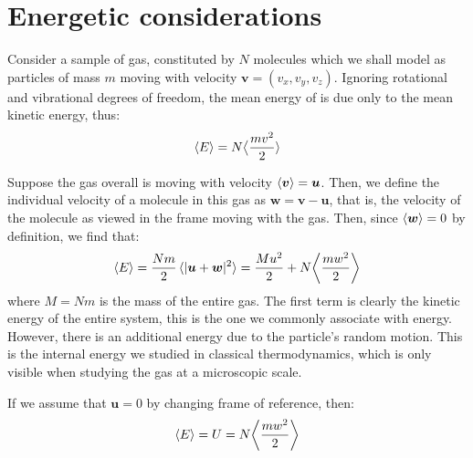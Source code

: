 \documentclass[a4paper,11pt,oneside]{book}
\newcommand{\BF}[1]{\boldsymbol{#1}}
\begin{document}
\section{Energetic considerations}
Consider a sample of gas, constituted by $N$ molecules which we shall model as particles of mass $m$ moving with velocity $\BF{v} = (v_x,v_y,v_z)$. Ignoring rotational and vibrational degrees of freedom, the mean energy of is due only to the mean kinetic energy, thus:
\begin{equation}
   \braket{E} = N \big \langle \frac{mv^2}{2}\rangle 
\end{equation}

Suppose the gas overall is moving with velocity $\braket{\BF{v}} = \BF{u}$. Then, we define the individual velocity of a molecule in this gas as $\BF{w} = \BF{v}-\BF{u}$, that is, the velocity of the molecule as viewed in the frame moving with the gas. Then, since $\braket{\BF{w}}=0$ by definition, we find that:
\begin{equation}
    \braket{E} = \frac{Nm}{2}\braket{|\BF{u}+\BF{w}|^2} = \frac{Mu^2}{2} + N \bigg \langle \frac{mw^2}{2} \bigg \rangle 
\end{equation}
where $M=Nm$ is the mass of the entire gas. The first term is clearly the kinetic energy of the entire system, this is the one we commonly associate with energy. However, there is an additional energy due to the particle's random motion. This is the internal energy we studied in classical thermodynamics, which is only visible when studying the gas at a microscopic scale. 


If we assume that $\BF{u}=0$ by changing frame of reference, then:
\begin{equation}
    \braket{E}=U=N \bigg \langle \frac{mw^2}{2} \bigg \rangle 
\end{equation}
\end{document}
